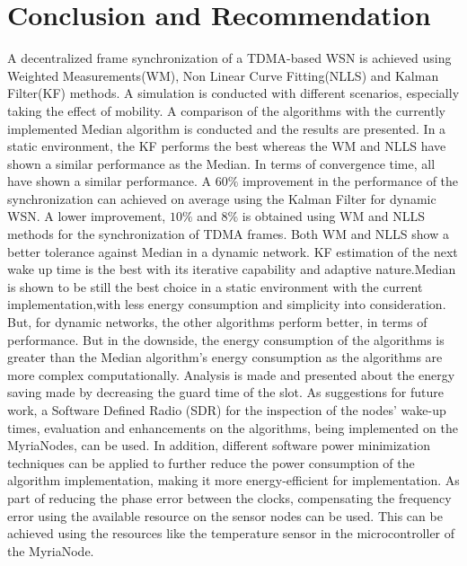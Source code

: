 \documentclass[journal]{IEEEtran}
\begin{document}
\section{\textbf{Conclusion and Recommendation}}
A decentralized frame synchronization of a TDMA-based WSN is achieved
using Weighted Measurements(WM), Non Linear Curve Fitting(NLLS) and
Kalman Filter(KF) methods. A simulation is conducted with different scenarios, especially
taking the effect of mobility. A comparison of the algorithms with the currently implemented Median algorithm
is conducted and the results are presented.
\newline
In a static environment, the KF performs the best whereas the WM and NLLS have shown a similar performance as the
Median. In terms of convergence time, all have shown a similar performance.
\newline
A $60\%$ improvement in the performance of the synchronization can
achieved on average using the Kalman Filter for dynamic WSN. A lower
improvement, $10\%$ and $8\%$ is obtained using WM and NLLS methods
for the synchronization of TDMA frames. Both WM and NLLS show a better tolerance
against Median in a dynamic network. KF estimation of
the next wake up time is the best with its iterative capability and
adaptive nature.\newline Median is shown to be still the best choice in a static environment with the current implementation,with less energy consumption and simplicity into consideration. But, for dynamic networks, the other algorithms perform better, in terms of
performance. 
\newline But in the downside, the energy consumption of the algorithms is
greater than the Median algorithm's energy consumption as the algorithms are more complex computationally. Analysis is made and presented about the energy saving made by decreasing the guard time of the slot. 
\newline  As suggestions for future work, a Software Defined Radio (SDR) for the inspection of the nodes' wake-up times, evaluation and enhancements on the algorithms, being implemented on the MyriaNodes, can be used. In addition, different software power minimization techniques can be applied to further reduce the power consumption of the algorithm implementation, making it more energy-efficient for implementation.  As part of reducing the phase error between the clocks, compensating the frequency error using the available resource on the sensor nodes can be used. This can be achieved using the resources like the temperature sensor in the
microcontroller of the MyriaNode.
\end{document}
